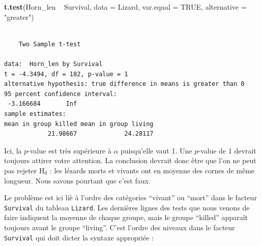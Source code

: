 \documentclass[a4paperpaper,]{article}
\newenvironment{Shaded}{\begin{snugshade}}{\end{snugshade}}
\newcommand{\DataTypeTok}[1]{\textcolor[rgb]{0.00,0.34,0.68}{#1}}
\newcommand{\KeywordTok}[1]{\textcolor[rgb]{0.12,0.11,0.11}{\textbf{#1}}}
\newcommand{\NormalTok}[1]{\textcolor[rgb]{0.12,0.11,0.11}{#1}}
\newcommand{\OperatorTok}[1]{\textcolor[rgb]{0.12,0.11,0.11}{#1}}
\newcommand{\OtherTok}[1]{\textcolor[rgb]{0.00,0.43,0.16}{#1}}
\newcommand{\StringTok}[1]{\textcolor[rgb]{0.75,0.01,0.01}{#1}}
\begin{document}
\begin{Shaded}
\begin{Highlighting}[]
\KeywordTok{t.test}\NormalTok{(Horn_len }\OperatorTok{~}\StringTok{ }\NormalTok{Survival, }
       \DataTypeTok{data =}\NormalTok{ Lizard, }\DataTypeTok{var.equal =} \OtherTok{TRUE}\NormalTok{,}
       \DataTypeTok{alternative =} \StringTok{"greater"}\NormalTok{)}
\end{Highlighting}
\end{Shaded}

\begin{verbatim}

    Two Sample t-test

data:  Horn_len by Survival
t = -4.3494, df = 182, p-value = 1
alternative hypothesis: true difference in means is greater than 0
95 percent confidence interval:
 -3.166684       Inf
sample estimates:
mean in group killed mean in group living 
            21.98667             24.28117 
\end{verbatim}

Ici, la \(p\)-value est très supérieure à \(\alpha\) puisqu'elle vaut 1. Une \(p\)-value de 1 devrait toujours attirer votre attention. La conclusion devrait donc être que l'on ne peut pas rejeter H\(_0\) : les lézards morts et vivants ont en moyenne des cornes de même longueur. Nous savons pourtant que c'est faux.

Le problème est ici liè à l'ordre des catégories ``vivant'' ou ``mort'' dans le facteur \texttt{Survival} du tableau \texttt{Lizard}. Les dernières lignes des tests que nous venons de faire indiquent la moyenne de chaque groupe, mais le groupe ``killed'' apparaît toujours avant le groupe ``living''. C'est l'ordre des niveaux dans le facteur \texttt{Survival} qui doit dicter la syntaxe appropriée :

\begin{Shaded}
\end{Shaded}
\end{document}
